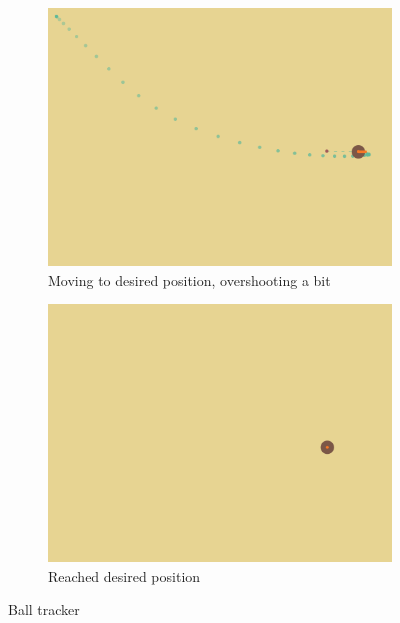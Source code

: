 \begin{figure}
	\begin{subfigure}[b]{0.80\linewidth}
		\includegraphics[trim = 0mm 110mm 0mm 0mm, clip, width=\linewidth]{figures/BallTracker-overshooting.png}
		\caption{Moving to desired position, overshooting a bit}
		\label{fig:balltracker-moving}
	\end{subfigure}
	
	\begin{subfigure}[b]{0.80\linewidth}
		\includegraphics[trim = 0mm 110mm 0mm 0mm, clip, width=\linewidth]{figures/BallTracker-desired.png}
		\caption{Reached desired position}
		\label{fig:balltracker-reached}
	\end{subfigure}
	\caption{Ball tracker}
	\label{fig:balltracker}
\end{figure}

